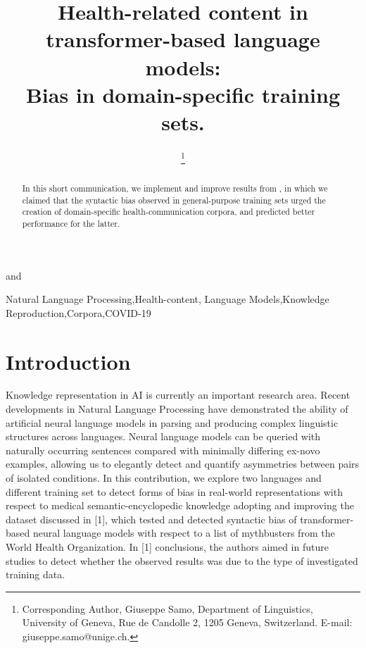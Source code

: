 \documentclass{IOS-Book-Article}
\def\hb{\hbox to 11.5 cm{}}
\begin{document}
\pagestyle{headings}
\def\thepage{}
\begin{frontmatter}              %


\title{Health-related content in transformer-based language models:\\ Bias in domain-specific training sets.}

\markboth{}{January 2023\hb}


\author[A]{ %
}
and
\author[B]{ 
\thanks{Corresponding Author, Giuseppe Samo, Department of Linguistics, University of Geneva, Rue de Candolle 2, 1205 Geneva, Switzerland. E-mail: giuseppe.samo@unige.ch.}}
\address[A]{University of Cambridge}
\address[B]{University of Geneva}

\begin{abstract}
In this short communication, we implement and improve results from \cite{r1}, in which we claimed that the syntactic bias observed in general-purpose training sets urged the creation of domain-specific health-communication corpora, and predicted better performance for the latter. 
\end{abstract}

\begin{keyword}
Natural Language Processing\sep Health-content\sep 
Language Models\sep Knowledge Reproduction\sep Corpora\sep COVID-19
\end{keyword}
\end{frontmatter}
\markboth{April 2022\hb}{April 2022\hb}

\section{Introduction}

Knowledge representation in AI is currently an important research area. 
Recent developments in Natural Language Processing have
demonstrated the ability of artificial neural language models in parsing and producing complex linguistic structures across languages. Neural language models can be queried with naturally occurring sentences compared with minimally differing ex-novo examples, allowing us to elegantly detect and quantify asymmetries between pairs of isolated conditions.
In this contribution, we explore two languages and different training set to detect forms of bias in real-world representations with respect to medical semantic-encyclopedic knowledge adopting and improving the dataset discussed in [1], which tested and detected syntactic bias of transformer-based neural language models with respect to a list of mythbusters from the World Health Organization.
In [1] conclusions, the authors aimed in future studies to detect whether the observed results was due to the type of investigated training data.
\end{document}

